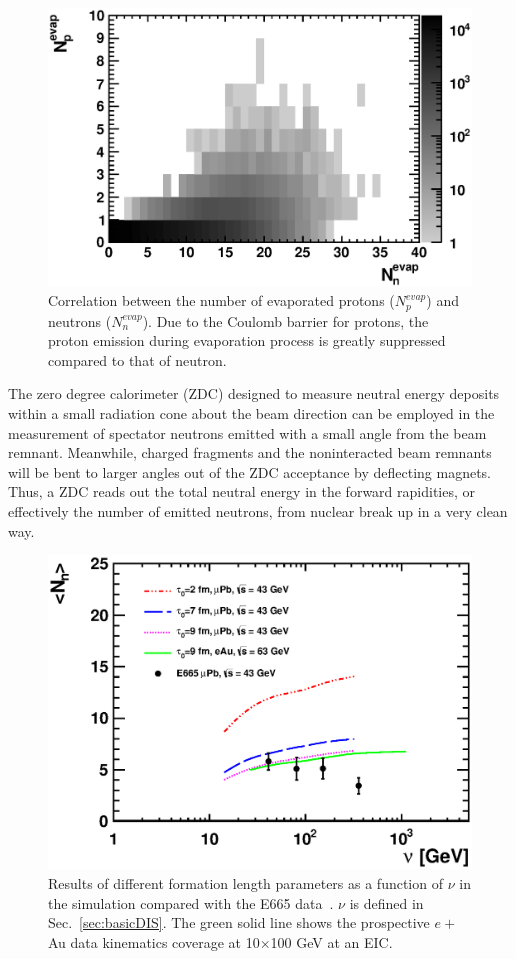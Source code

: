 \begin{figure}
\begin{center}
\includegraphics[width=0.7\columnwidth,keepaspectratio]{plots/chpt7/evap_protonVsneutron_black.eps}
\caption[Correlation between the number of protons ($N^{evap}_{p}$) and neutrons ($N^{evap}_{n}$) during evaporation processes]{Correlation between the number of evaporated protons ($N^{evap}_{p}$) and neutrons ($N^{evap}_{n}$). Due
to the Coulomb barrier for protons, the proton emission during
evaporation process is greatly suppressed compared to that of neutron.}
\label{fig:evapNeutronVsProton}
\end{center}
\end{figure}

The zero degree calorimeter (ZDC) designed to measure neutral energy deposits
within a small radiation cone about the beam direction can be employed in the
measurement of spectator neutrons emitted with a small angle from the beam
remnant. Meanwhile, charged fragments and the noninteracted
beam remnants will be bent to larger angles out of the ZDC acceptance by
deflecting magnets. Thus, a ZDC reads out the total
neutral energy in the forward rapidities, or effectively the number of
emitted neutrons, from nuclear break up in a very clean way.

\begin{figure}
\begin{center}
\includegraphics[width=0.7\columnwidth,keepaspectratio]{plots/chpt7/tau_comparison.eps}
\caption[Average neutron number from evaporation processes versus $\nu$ compared to the E665 measurement]{Results of different formation length parameters as a function of $\nu$ in the simulation compared with the E665 data~\cite{Adams:1995nu}. $\nu$ is defined in Sec.~\ref{sec:basicDIS}. The green solid line shows the prospective $e+$Au data kinematics coverage at 10$\times$100 GeV at an EIC.}
\label{fig:tauCompare}
\end{center}
\end{figure}

